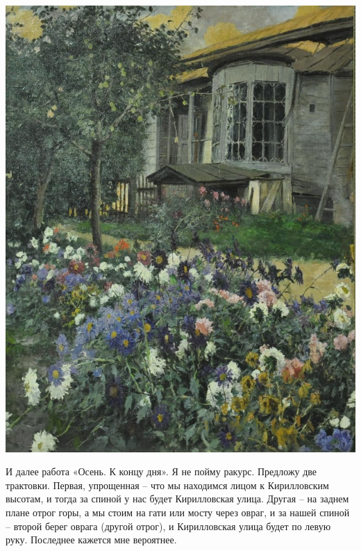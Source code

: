 \begin{center}
\includegraphics[width=\linewidth]{chast-kirvys/svetosl/sveto-dom-hud-good.jpg}
\end{center}

И далее работа «Осень. К концу дня». Я не пойму ракурс. Предложу две трактовки. Первая, упрощенная – что мы находимся лицом к Кирилловским высотам, и тогда за спиной у нас будет Кирилловская улица. Другая – на заднем плане отрог горы, а мы стоим на гати или мосту через овраг, и за нашей спиной – второй берег оврага (другой отрог), и Кирилловская улица будет по левую руку. Последнее кажется мне вероятнее.

